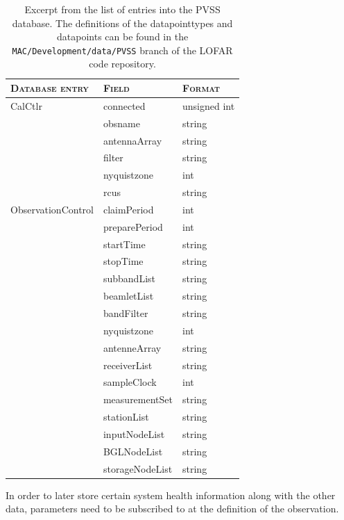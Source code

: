 \documentclass[a4paper,10pt,bibtotoc]{scrartcl}
\begin{document}
\begin{table}[htb]
  \centering
  \begin{tabular}{|lll|}
    \hline
    \textsc{Database entry} & \textsc{Field} & \textsc{Format} \\
    \hline
    \hline
    CalCtlr & connected    & unsigned int \\
            & obsname      & string \\
            & antennaArray & string \\
            & filter       & string \\
            & nyquistzone  & int \\
            & rcus         & string \\
    \hline
    ObservationControl & claimPeriod & int \\
    & preparePeriod   & int \\
    & startTime       & string \\
    & stopTime        & string \\
    & subbandList     & string \\
    & beamletList     & string \\
    & bandFilter      & string \\
    & nyquistzone     & int \\
    & antenneArray    & string \\
    & receiverList    & string \\
    & sampleClock     & int \\
    & measurementSet  & string \\
    & stationList     & string \\
    & inputNodeList   & string \\
    & BGLNodeList     & string \\
    & storageNodeList & string \\
    \hline
  \end{tabular}
  \caption[Excerpt from the list of entries into the PVSS database.]{
    Excerpt from the list of entries into the PVSS database. The
    definitions of the datapointtypes and datapoints can be found in the
    \texttt{MAC/Development/data/PVSS} branch of the LOFAR code repository.}
  \label{tab:PVSS}
\end{table}

In order to later store certain system health information along with the other
data, parameters need to be subscribed to at the definition of the observation.
\end{document}
